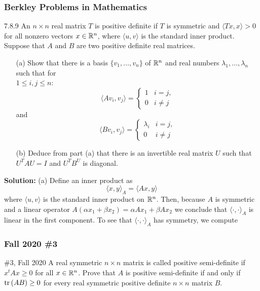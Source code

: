 \documentclass{article}
\begin{document}
\break 

\subsubsection{Berkley Problems in Mathematics}

\begin{problem}{7.8.9} An $n\times n$ real matrix $T$ is positive definite if $T$ is symmetric and $\langle Tx, x\rangle >0$ for all nonzero vectors $x\in \mathbb R^n$, where $\langle u, v\rangle$ is the standard inner product. Suppose that $A$ and $B$ are two positive definite real matrices. 
	\begin{enumerate}
		\item[(a)] Show that there is a basis $\{v_1, \dots, v_n\}$ of $\mathbb R^n$ and real numbers $\lambda_1, \dots, \lambda_n$ such that for\\ 
				$1 \leq i, j \leq n$:
					\[ \langle Av_i, v_j \rangle = 
							\begin{cases} 
								1 & i = j,\\
								0 & i \neq j
							\end{cases}\]
					and 
					\[ \langle Bv_i, v_j \rangle = 
							\begin{cases} 
								\lambda_i & i = j,\\
								0 & i \neq j
							\end{cases}\]
						 
		\item[(b)] Deduce from part (a) that there is an invertible real matrix $U$ such that $U^TAU = I$ and $U^TB^U$ is diagonal.	
	\end{enumerate}
\end{problem}


\textbf{Solution:} (a) Define an inner product as
	\[ \langle x, y \rangle_A = \langle Ax, y \rangle \]
where $\langle u, v\rangle$ is the standard inner product on $\mathbb R^n$. Then, because $A$ is symmetric and a linear operator $A(\alpha x_1 + \beta x_2) = \alpha Ax_1 + \beta Ax_2$ we conclude that $\langle \cdot, \cdot \rangle_A$ is linear in the first component. To see that $\langle \cdot, \cdot \rangle_A$ has symmetry, we compute 
	\[\]
	
	
\break 

\subsubsection{Fall 2020 \#3}

\begin{problem}{\#3, Fall 2020} A real symmetric $n\times n$ matrix is called positive semi-definite if $x^tAx\geq 0$ for all $x\in\mathbb R^n$. Prove that $A$ is positive semi-definite if and only if $\text{tr}\left({AB}\right)\geq 0$ for every real symmetric positive definite $n\times n$ matrix $B$.
\end{problem}
\end{document}
